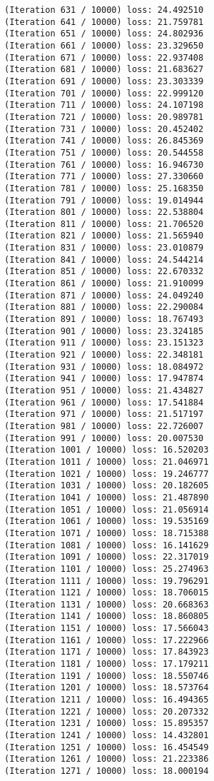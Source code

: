 \documentclass[11pt]{article}
\begin{document}
\begin{Verbatim}[commandchars=\\\{\}]
(Iteration 631 / 10000) loss: 24.492510
(Iteration 641 / 10000) loss: 21.759781
(Iteration 651 / 10000) loss: 24.802936
(Iteration 661 / 10000) loss: 23.329650
(Iteration 671 / 10000) loss: 22.937408
(Iteration 681 / 10000) loss: 21.683627
(Iteration 691 / 10000) loss: 23.303339
(Iteration 701 / 10000) loss: 22.999120
(Iteration 711 / 10000) loss: 24.107198
(Iteration 721 / 10000) loss: 20.989781
(Iteration 731 / 10000) loss: 20.452402
(Iteration 741 / 10000) loss: 26.845369
(Iteration 751 / 10000) loss: 20.544558
(Iteration 761 / 10000) loss: 16.946730
(Iteration 771 / 10000) loss: 27.330660
(Iteration 781 / 10000) loss: 25.168350
(Iteration 791 / 10000) loss: 19.014944
(Iteration 801 / 10000) loss: 22.538804
(Iteration 811 / 10000) loss: 21.706520
(Iteration 821 / 10000) loss: 21.565940
(Iteration 831 / 10000) loss: 23.010879
(Iteration 841 / 10000) loss: 24.544214
(Iteration 851 / 10000) loss: 22.670332
(Iteration 861 / 10000) loss: 21.910099
(Iteration 871 / 10000) loss: 24.049240
(Iteration 881 / 10000) loss: 22.290084
(Iteration 891 / 10000) loss: 18.767493
(Iteration 901 / 10000) loss: 23.324185
(Iteration 911 / 10000) loss: 23.151323
(Iteration 921 / 10000) loss: 22.348181
(Iteration 931 / 10000) loss: 18.084972
(Iteration 941 / 10000) loss: 17.947874
(Iteration 951 / 10000) loss: 21.434827
(Iteration 961 / 10000) loss: 17.541884
(Iteration 971 / 10000) loss: 21.517197
(Iteration 981 / 10000) loss: 22.726007
(Iteration 991 / 10000) loss: 20.007530
(Iteration 1001 / 10000) loss: 16.520203
(Iteration 1011 / 10000) loss: 21.046971
(Iteration 1021 / 10000) loss: 19.246777
(Iteration 1031 / 10000) loss: 20.182605
(Iteration 1041 / 10000) loss: 21.487890
(Iteration 1051 / 10000) loss: 21.056914
(Iteration 1061 / 10000) loss: 19.535169
(Iteration 1071 / 10000) loss: 18.715388
(Iteration 1081 / 10000) loss: 16.141629
(Iteration 1091 / 10000) loss: 22.317019
(Iteration 1101 / 10000) loss: 25.274963
(Iteration 1111 / 10000) loss: 19.796291
(Iteration 1121 / 10000) loss: 18.706015
(Iteration 1131 / 10000) loss: 20.668363
(Iteration 1141 / 10000) loss: 18.860805
(Iteration 1151 / 10000) loss: 17.566043
(Iteration 1161 / 10000) loss: 17.222966
(Iteration 1171 / 10000) loss: 17.843923
(Iteration 1181 / 10000) loss: 17.179211
(Iteration 1191 / 10000) loss: 18.550746
(Iteration 1201 / 10000) loss: 18.573764
(Iteration 1211 / 10000) loss: 16.494365
(Iteration 1221 / 10000) loss: 20.207332
(Iteration 1231 / 10000) loss: 15.895357
(Iteration 1241 / 10000) loss: 14.432801
(Iteration 1251 / 10000) loss: 16.454549
(Iteration 1261 / 10000) loss: 21.223386
(Iteration 1271 / 10000) loss: 18.000194

\end{Verbatim}
\end{document}
